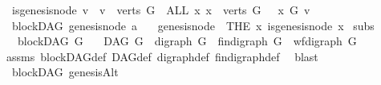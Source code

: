 \begin{isabellebody}
\ \ {\isachardoublequoteopen}is{\isacharunderscore}{\kern0pt}genesis{\isacharunderscore}{\kern0pt}node\ v\ {\isacharequal}{\kern0pt}\ {\isacharparenleft}{\kern0pt}{\isacharparenleft}{\kern0pt}v\ {\isasymin}\ verts\ G{\isacharparenright}{\kern0pt}\ {\isasymand}\ {\isacharparenleft}{\kern0pt}ALL\ x{\isachardot}{\kern0pt}\ {\isacharparenleft}{\kern0pt}x\ {\isasymin}\ verts\ G{\isacharparenright}{\kern0pt}\ {\isasymlongrightarrow}\ \ x\ {\isasymrightarrow}\isactrlsup {\isacharasterisk}{\kern0pt}\isactrlbsub G\isactrlesub \ v{\isacharparenright}{\kern0pt}{\isacharparenright}{\kern0pt}{\isachardoublequoteclose}\isanewline
\isanewline
{}\isamarkupfalse%
\ {\isacharparenleft}{\kern0pt}\ blockDAG{\isacharparenright}{\kern0pt}\ genesis{\isacharunderscore}{\kern0pt}node{\isacharcolon}{\kern0pt}{\isacharcolon}{\kern0pt}\ {\isachardoublequoteopen}{\isacharprime}{\kern0pt}a{\isachardoublequoteclose}\isanewline
\ \ \ {\isachardoublequoteopen}genesis{\isacharunderscore}{\kern0pt}node\ {\isacharequal}{\kern0pt}\ {\isacharparenleft}{\kern0pt}THE\ x{\isachardot}{\kern0pt}\ is{\isacharunderscore}{\kern0pt}genesis{\isacharunderscore}{\kern0pt}node\ x{\isacharparenright}{\kern0pt}{\isachardoublequoteclose}%
\isadelimdocument
%
\endisadelimdocument
%
\isatagdocument
%
\isamarkuptrue%
%
\endisatagdocument
{\isafolddocument}%
%
\isadelimdocument
%
\endisadelimdocument
{}\isamarkupfalse%
\ subs{\isacharcolon}{\kern0pt}\isanewline
\ \ \ {\isachardoublequoteopen}blockDAG\ G{\isachardoublequoteclose}\isanewline
\ \ \ {\isachardoublequoteopen}DAG\ G\ {\isasymand}\ digraph\ G\ {\isasymand}\ fin{\isacharunderscore}{\kern0pt}digraph\ G\ {\isasymand}\ wf{\isacharunderscore}{\kern0pt}digraph\ G{\isachardoublequoteclose}\isanewline
%
\isadelimproof
\ \ %
\endisadelimproof
%
\isatagproof
{}\isamarkupfalse%
\ assms\ blockDAG{\isacharunderscore}{\kern0pt}def\ DAG{\isacharunderscore}{\kern0pt}def\ digraph{\isacharunderscore}{\kern0pt}def\ fin{\isacharunderscore}{\kern0pt}digraph{\isacharunderscore}{\kern0pt}def\ \isamarkupfalse%
\ blast%
\endisatagproof
{\isafoldproof}%
%
\isadelimproof
%
\endisadelimproof
%
\isadelimdocument
%
\endisadelimdocument
%
\isatagdocument
%
\isamarkuptrue%
%
\endisatagdocument
{\isafolddocument}%
%
\isadelimdocument
%
\endisadelimdocument
{}\isamarkupfalse%
\ {\isacharparenleft}{\kern0pt}\ blockDAG{\isacharparenright}{\kern0pt}\ genesisAlt\ {\isacharcolon}{\kern0pt}\isanewline

\end{isabellebody}
